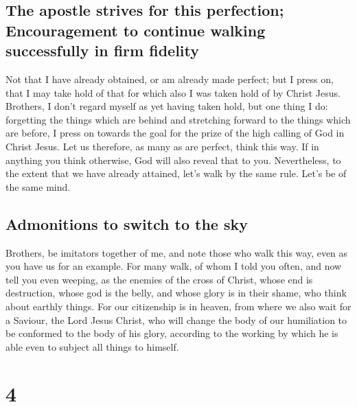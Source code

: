 \hypertarget{the-apostle-strives-for-this-perfection-encouragement-to-continue-walking-successfully-in-firm-fidelity}{%
\subsection{The apostle strives for this perfection; Encouragement to
continue walking successfully in firm
fidelity}\label{the-apostle-strives-for-this-perfection-encouragement-to-continue-walking-successfully-in-firm-fidelity}}

 Not that I have already obtained, or am already made
perfect; but I press on, that I may take hold of that for which also I
was taken hold of by Christ Jesus.  Brothers, I don't
regard myself as yet having taken hold, but one thing I do: forgetting
the things which are behind and stretching forward to the things which
are before,  I press on towards the goal for the prize of
the high calling of God in Christ Jesus.  Let us
therefore, as many as are perfect, think this way. If in anything you
think otherwise, God will also reveal that to you. 
Nevertheless, to the extent that we have already attained, let's walk by
the same rule. Let's be of the same mind.

\hypertarget{admonitions-to-switch-to-the-sky}{%
\subsection{Admonitions to switch to the
sky}\label{admonitions-to-switch-to-the-sky}}

 Brothers, be imitators together of me, and note those
who walk this way, even as you have us for an example. 
For many walk, of whom I told you often, and now tell you even weeping,
as the enemies of the cross of Christ,  whose end is
destruction, whose god is the belly, and whose glory is in their shame,
who think about earthly things.  For our citizenship is
in heaven, from where we also wait for a Saviour, the Lord Jesus Christ,
 who will change the body of our humiliation to be
conformed to the body of his glory, according to the working by which he
is able even to subject all things to himself.

\hypertarget{section-3}{%
\section{4}\label{section-3}}

